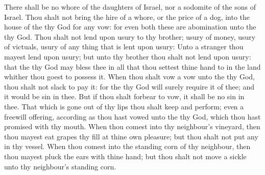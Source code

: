 \begin{biblechapter}
\verse There shall be no whore of the daughters of Israel, nor a sodomite of the sons of Israel.
\verse Thou shalt not bring the hire of a whore, or the price of a dog, into the house of the \LORD thy God for any vow: for even both these are abomination unto the \LORD thy God.
\verse Thou shalt not lend upon usury to thy brother; usury of money, usury of victuals, usury of any thing that is lent upon usury:
\verse Unto a stranger thou mayest lend upon usury; but unto thy brother thou shalt not lend upon usury: that the \LORD thy God may bless thee in all that thou settest thine hand to in the land whither thou goest to possess it.
\verse When thou shalt vow a vow unto the \LORD thy God, thou shalt not slack to pay it: for the \LORD thy God will surely require it of thee; and it would be sin in thee.
\verse But if thou shalt forbear to vow, it shall be no sin in thee.
\verse That which is gone out of thy lips thou shalt keep and perform; even a freewill offering, according as thou hast vowed unto the \LORD thy God, which thou hast promised with thy mouth.
\verse When thou comest into thy neighbour's vineyard, then thou mayest eat grapes thy fill at thine own pleasure; but thou shalt not put any in thy vessel.
\verse When thou comest into the standing corn of thy neighbour, then thou mayest pluck the ears with thine hand; but thou shalt not move a sickle unto thy neighbour's standing corn.
\end{biblechapter}

